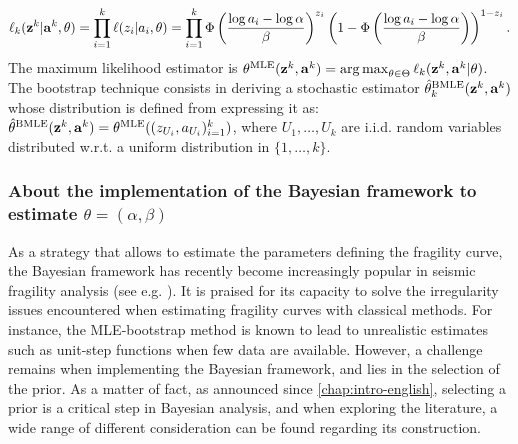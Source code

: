 \begin{equation}
    \ell_k(\mathbf{z}^k|\mathbf{a}^k,\theta) = \prod_{i=1}^k\ell(z_i|a_i,\theta) = \prod_{i=1}^k\Phi\left(\frac{\log a_i-\log\alpha}{\beta}\right)^{z_i}\left(1-\Phi\left(\frac{\log a_i-\log\alpha}{\beta}\right)\right)^{1-z_i}.
\end{equation}
The maximum likelihood estimator is $\theta^{\text{MLE}}(\mathbf{z}^k,\mathbf{a}^k)=\operatorname*{arg\,max}_{\theta\in\Theta}\ell_k(\mathbf{z}^k,\mathbf{a}^k|\theta)$.
The bootstrap technique consists in deriving a stochastic estimator $\hat\theta_k^{\text{BMLE}}(\mathbf{z}^k,\mathbf{a}^k)$ whose distribution is defined from expressing it as: $\hat\theta^{\text{BMLE}}(\mathbf{z}^k,\mathbf{a}^k)=\theta^{\text{MLE}}((z_{U_i},a_{U_i})_{i=1}^k)$, where $U_1,\dots,U_k$ are i.i.d. random variables distributed w.r.t. a uniform distribution in $\{1,\dots,k\}$.



 




\subsubsection{About the implementation of the Bayesian framework to estimate $\theta=(\alpha,\beta)$}

As a strategy that allows to estimate the parameters defining the fragility curve, 
the Bayesian framework has recently become increasingly popular in seismic fragility analysis (see e.g. \cite{gardoni_probabilistic_2002,wang_bayesian_2018,katayama_bayesian-estimation-based_2021,koutsourelakis_assessing_2010,damblin_approche_2014,tadinada_structural_2017,kwag_computationally_2018,jeon_parameterized_2019,tabandeh_physics-based_2020}). 
It is praised for its capacity to solve the irregularity issues encountered when estimating fragility curves with classical methods. For instance, the MLE-bootstrap method is known to lead to unrealistic estimates such as unit-step functions when few data are available.
However, a challenge remains when %
implementing the Bayesian framework, and 
lies in the selection of the prior.
As a matter of fact, as announced since \cref{chap:intro-english}, selecting a prior is a critical step in Bayesian analysis, %
and when exploring the literature, a wide range of different consideration can be found regarding its construction. %
%

